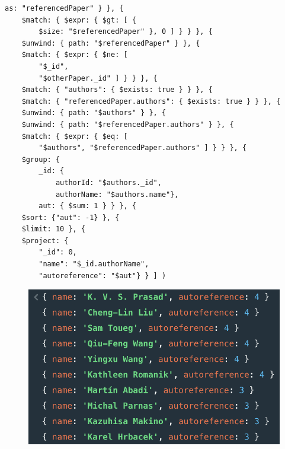 \begin{enumerate}
\begin{lstlisting}[label={lst:query11mongodb}]
        as: "referencedPaper" } }, {
    $match: { $expr: { $gt: [ {
        $size: "$referencedPaper" }, 0 ] } } }, {
    $unwind: { path: "$referencedPaper" } }, {
    $match: { $expr: { $ne: [
        "$_id",
        "$otherPaper._id" ] } } }, {
    $match: { "authors": { $exists: true } } }, {
    $match: { "referencedPaper.authors": { $exists: true } } }, {
    $unwind: { path: "$authors" } }, {
    $unwind: { path: "$referencedPaper.authors" } }, {
    $match: { $expr: { $eq: [
        "$authors", "$referencedPaper.authors" ] } } }, {
    $group: {
        _id: {
            authorId: "$authors._id",
            authorName: "$authors.name"},
        aut: { $sum: 1 } } }, {
    $sort: {"aut": -1} }, {
    $limit: 10 }, {
    $project: {
        "_id": 0,
        "name": "$_id.authorName",
        "autoreference": "$aut"} } ] )
    \end{lstlisting}
    \begin{figure}[H]
        \begin{center}
            \includegraphics[width=0.6\linewidth]{ImagesMongoDB/query11mongodb}
            \label{fig:query11mongodb}%
        \end{center}
    \end{figure}
\end{enumerate}
